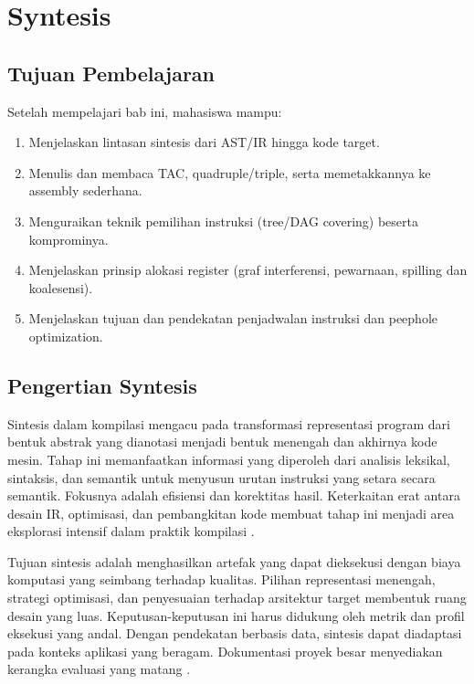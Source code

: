 \documentclass[../main.tex]{subfiles}
\begin{document}
\chapter{Syntesis}

\section{Tujuan Pembelajaran}
Setelah mempelajari bab ini, mahasiswa mampu:
\begin{enumerate}[label=\alph*)]
  \item Menjelaskan lintasan sintesis dari AST/IR hingga kode target.
  \item Menulis dan membaca TAC, quadruple/triple, serta memetakkannya ke assembly sederhana.
  \item Menguraikan teknik pemilihan instruksi (tree/DAG covering) beserta komprominya.
  \item Menjelaskan prinsip alokasi register (graf interferensi, pewarnaan, spilling dan koalesensi).
  \item Menjelaskan tujuan dan pendekatan penjadwalan instruksi dan peephole optimization.
\end{enumerate}

\section{Pengertian Syntesis}
Sintesis dalam kompilasi mengacu pada transformasi representasi program dari bentuk abstrak yang dianotasi menjadi bentuk menengah dan akhirnya kode mesin. Tahap ini memanfaatkan informasi yang diperoleh dari analisis leksikal, sintaksis, dan semantik untuk menyusun urutan instruksi yang setara secara semantik. Fokusnya adalah efisiensi dan korektitas hasil. Keterkaitan erat antara desain IR, optimisasi, dan pembangkitan kode membuat tahap ini menjadi area eksplorasi intensif dalam praktik kompilasi \citep{LLVMOverview,WikiOptimization}.

Tujuan sintesis adalah menghasilkan artefak yang dapat dieksekusi dengan biaya komputasi yang seimbang terhadap kualitas. Pilihan representasi menengah, strategi optimisasi, dan penyesuaian terhadap arsitektur target membentuk ruang desain yang luas. Keputusan-keputusan ini harus didukung oleh metrik dan profil eksekusi yang andal. Dengan pendekatan berbasis data, sintesis dapat diadaptasi pada konteks aplikasi yang beragam. Dokumentasi proyek besar menyediakan kerangka evaluasi yang matang \citep{LLVMOverview}.
\end{document}
